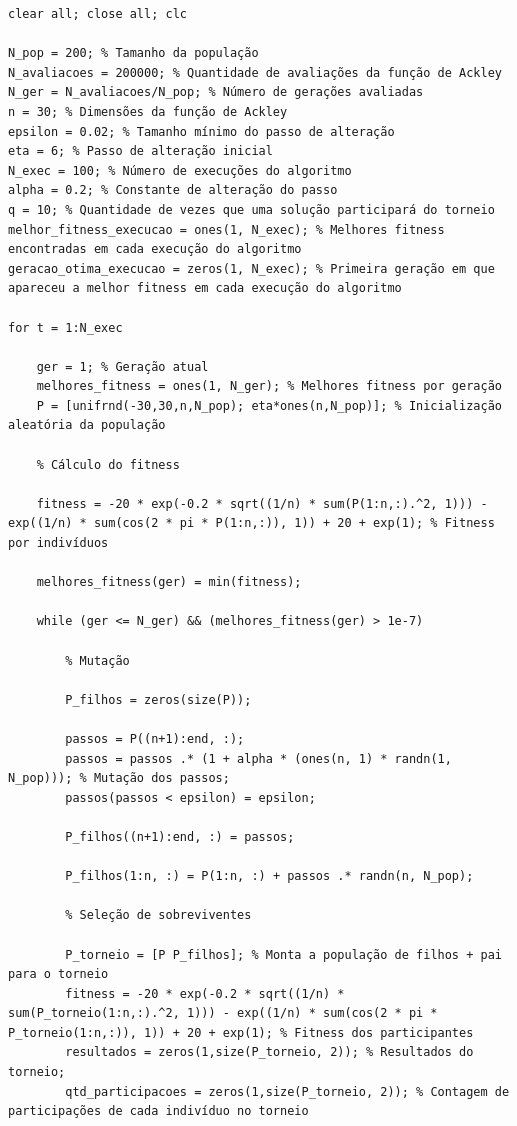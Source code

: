 \documentclass{report}
\begin{document}
\begin{lstlisting}
clear all; close all; clc

N_pop = 200; % Tamanho da população
N_avaliacoes = 200000; % Quantidade de avaliações da função de Ackley
N_ger = N_avaliacoes/N_pop; % Número de gerações avaliadas 
n = 30; % Dimensões da função de Ackley
epsilon = 0.02; % Tamanho mínimo do passo de alteração
eta = 6; % Passo de alteração inicial
N_exec = 100; % Número de execuções do algoritmo
alpha = 0.2; % Constante de alteração do passo
q = 10; % Quantidade de vezes que uma solução participará do torneio
melhor_fitness_execucao = ones(1, N_exec); % Melhores fitness encontradas em cada execução do algoritmo
geracao_otima_execucao = zeros(1, N_exec); % Primeira geração em que apareceu a melhor fitness em cada execução do algoritmo

for t = 1:N_exec
    
    ger = 1; % Geração atual
    melhores_fitness = ones(1, N_ger); % Melhores fitness por geração 
    P = [unifrnd(-30,30,n,N_pop); eta*ones(n,N_pop)]; % Inicialização aleatória da população
    
    % Cálculo do fitness
    
    fitness = -20 * exp(-0.2 * sqrt((1/n) * sum(P(1:n,:).^2, 1))) - exp((1/n) * sum(cos(2 * pi * P(1:n,:)), 1)) + 20 + exp(1); % Fitness por indivíduos 
    
    melhores_fitness(ger) = min(fitness);
    
    while (ger <= N_ger) && (melhores_fitness(ger) > 1e-7)
        
        % Mutação
        
        P_filhos = zeros(size(P));
        
        passos = P((n+1):end, :);
        passos = passos .* (1 + alpha * (ones(n, 1) * randn(1, N_pop))); % Mutação dos passos;
        passos(passos < epsilon) = epsilon;
        
        P_filhos((n+1):end, :) = passos;
        
        P_filhos(1:n, :) = P(1:n, :) + passos .* randn(n, N_pop);
        
        % Seleção de sobreviventes
        
        P_torneio = [P P_filhos]; % Monta a população de filhos + pai para o torneio
        fitness = -20 * exp(-0.2 * sqrt((1/n) * sum(P_torneio(1:n,:).^2, 1))) - exp((1/n) * sum(cos(2 * pi * P_torneio(1:n,:)), 1)) + 20 + exp(1); % Fitness dos participantes
        resultados = zeros(1,size(P_torneio, 2)); % Resultados do torneio;
        qtd_participacoes = zeros(1,size(P_torneio, 2)); % Contagem de participações de cada indivíduo no torneio


\end{lstlisting}
\end{document}
